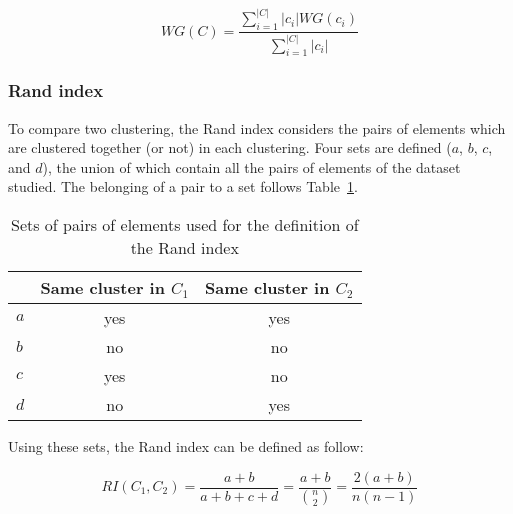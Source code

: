     \begin{equation}
        WG(C) = \frac{\sum_{i=1}^{|C|} |c_i| WG(c_i)}{\sum_{i=1}^{|C|} |c_i|}
        \label{eq:wg_index_global}
    \end{equation}

    \subsubsection{Rand index}
    To compare two clustering, the Rand index considers the pairs of elements which are clustered together (or not) in each clustering. Four sets are defined ($a$, $b$, $c$, and $d$), the union of which contain all the pairs of elements of the dataset studied. The belonging of a pair to a set follows Table~\ref{tab:rand_index}.
    
    \vspace{0.8cm}

    \begin{table}[h]
    \centering
    \begin{tabular}{lcc}
                                       & \multicolumn{1}{l}{\textbf{Same cluster in $C_1$}} & \multicolumn{1}{l}{\textbf{Same cluster in $C_2$}} \\ \bottomrule
    \multicolumn{1}{l}{\textbf{$a$}} & yes                                                 & yes                                                 \\ \bottomrule
    \multicolumn{1}{l}{\textbf{$b$}} & no                                                  & no                                                  \\ \bottomrule
    \multicolumn{1}{l}{\textbf{$c$}} & yes                                                 & no                                                  \\ \bottomrule
    \multicolumn{1}{l}{\textbf{$d$}} & no                                                  & yes                                                 \\ \bottomrule
    \end{tabular}
    \caption{Sets of pairs of elements used for the definition of the Rand index}
\label{tab:rand_index}
    \end{table}

    \vspace{0.8cm}

    Using these sets, the Rand index can be defined as follow:

    \begin{equation}
        RI(C_1, C_2) = \frac{a + b}{a + b + c + d} = \frac{a + b}{\binom{n}{2}} = \frac{2(a + b)}{n(n-1)}
        \label{eq:rand_index}
    \end{equation}

